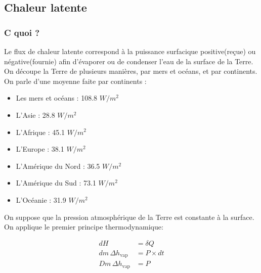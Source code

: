 \documentclass[a4paper,12pt]{article}
\begin{document}
\subsection*{Chaleur latente}

\subsubsection*{C quoi ?}

Le flux de chaleur latente correspond à la puissance surfacique positive(reçue) ou négative(fournie) afin d'évaporer ou de condenser l'eau de la surface de la Terre.
On découpe la Terre de plusieurs manières, par mers et océans, et par continents. 
On parle d'une moyenne faite par continents :
\begin{itemize}
    \item Les mers et océans : 108.8 $W/m^2$
    \item L'Asie : 28.8 $W/m^2$
    \item L'Afrique : 45.1 $W/m^2$
    \item L'Europe : 38.1 $W/m^2$
    \item L'Amérique du Nord : 36.5 $W/m^2$
    \item L'Amérique du Sud : 73.1 $W/m^2$
    \item L'Océanie : 31.9 $W/m^2$
\end{itemize}

On suppose que la pression atmosphérique de la Terre est constante à la surface. On applique le premier principe thermodynamique:

\vspace{1cm}
\begin{align}
    dH &= \delta Q \\
    dm \, \Delta h_{\text{vap}} &= P \times dt \\
    Dm \, \Delta h_{\text{vap}} &= P
\end{align}
\end{document}
